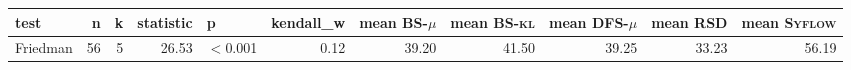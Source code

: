 \begin{tabular}{lrrrlrrrrrr}
\toprule
    test &  n &  k &  statistic &        p &  kendall\_w &  mean \textsc{BS-$\mu$} &  mean \textsc{BS-kl} &  mean \textsc{DFS-$\mu$} &  mean \textsc{RSD} &  mean \textsc{Syflow} \\
\midrule
Friedman & 56 &  5 &      26.53 & $<$0.001 &        0.12 &                   39.20 &                41.50 &                    39.25 &              33.23 &                 56.19 \\
\bottomrule
\end{tabular}
